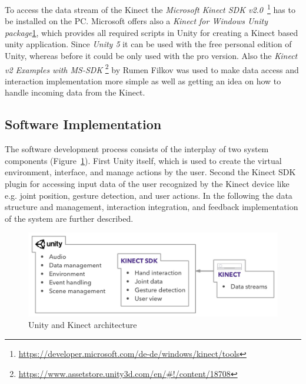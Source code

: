 To access the data stream of the Kinect the \textit{Microsoft Kinect SDK v2.0}~\footnote{\label{fn:kinectTools}\url{https://developer.microsoft.com/de-de/windows/kinect/tools}} has to be installed on the PC. Microsoft offers also a \textit{Kinect for Windows Unity package}\cref{fn:kinectTools}, which provides all required scripts in Unity for creating a Kinect based unity application. Since \textit{Unity 5} it can be used with the free personal edition of Unity, whereas before it could be only used with the pro version. Also the \textit{Kinect v2 Examples with MS-SDK} \footnote{\url{https://www.assetstore.unity3d.com/en/\#!/content/18708}} by Rumen Filkov was used to make data access and interaction implementation more simple as well as getting an idea on how to handle incoming data from the Kinect.


\subsection{Software Implementation}
The software development process consists of the interplay of two system components (Figure~\ref{fig:5_3_unityKinectArchitecture}). First Unity itself, which is used to create the virtual environment, interface, and manage actions by the user. Second the Kinect SDK plugin for accessing input data of the user recognized by the Kinect device like e.g. joint position, gesture detection, and user actions. In the following the data structure and management, interaction integration, and feedback implementation of the system are further described.
\begin{figure}[htb]
	\centering
	\begin{minipage}[t]{1\linewidth}
		\centering
		\includegraphics[width=1\linewidth]{Pictures/5_3_unityKinectArchitecture}
		\caption{Unity and Kinect architecture}
		\label{fig:5_3_unityKinectArchitecture}
	\end{minipage}
\end{figure}

